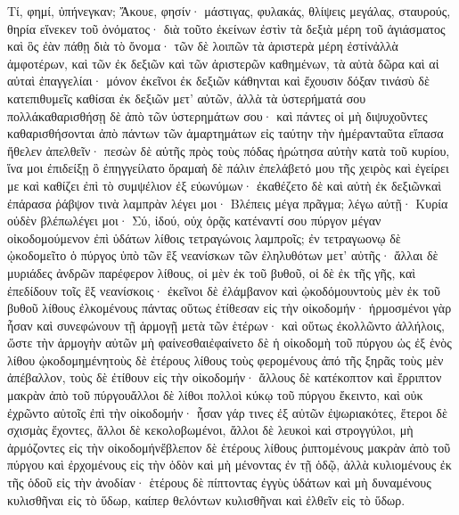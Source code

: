 Τί, φημί, ὐπήνεγκαν; Ἄκουε, φησίν· μάστιγας, φυλακάς, θλίψεις μεγάλας, σταυρούς, θηρία εἵνεκεν τοῦ ὀνόματος· διὰ τοῦτο ἐκείνων ἐστὶν τὰ δεξιὰ μέρη τοῦ ἁγιάσματος καὶ ὃς ἐὰν πάθῃ διὰ τὸ ὄνομα· τῶν δὲ λοιπῶν τὰ ἀριστερὰ μέρη ἐστίνἀλλὰ ἀμφοτέρων, καὶ τῶν ἐκ δεξιῶν καὶ τῶν ἀριστερῶν καθημένων, τὰ αὐτὰ δῶρα καὶ αἱ αὐταὶ ἐπαγγελίαι· μόνον ἐκεῖνοι ἐκ δεξιῶν κάθηνται καὶ ἔχουσιν δόξαν τινάσὺ δὲ κατεπιθυμεῖς καθίσαι ἐκ δεξιῶν μετ’ αὐτῶν, ἀλλὰ τὰ ὑστερήματά σου πολλάκαθαρισθήσῃ δὲ ἀπὸ τῶν ὑστερημάτων σου· καὶ πάντες οἱ μὴ διψυχοῦντες καθαρισθήσονται ἀπὸ πάντων τῶν ἁμαρτημάτων εἰς ταύτην τὴν ἡμέρανταῦτα εἴπασα ἤθελεν ἀπελθεῖν· πεσὼν δὲ αὐτῆς πρὸς τοὺς πόδας ἠρώτησα αὐτὴν κατὰ τοῦ κυρίου, ἵνα μοι ἐπιδείξῃ ὃ ἐπηγγείλατο ὅραμαἡ δὲ πάλιν ἐπελάβετό μου τῆς χειρὸς καὶ ἐγείρει με καὶ καθίζει ἐπὶ τὸ συμψέλιον ἐξ εὐωνύμων· ἐκαθέζετο δὲ καὶ αὐτὴ ἐκ δεξιῶνκαὶ ἐπάρασα ῥάβψον τινὰ λαμπρὰν λέγει μοι· Βλέπεις μέγα πρᾶγμα; λέγω αὐτῇ· Κυρία οὐδὲν βλέπωλέγει μοι· Σύ, ἰδού, οὐχ ὁρᾷς κατέναντί σου πύργον μέγαν οἰκοδομούμενον ἐπὶ ὑδάτων λίθοις τετραγώνοις λαμπροῖς; ἐν τετραγωονῳ δὲ ᾠκοδομεῖτο ὁ πύργος ὑπὸ τῶν ἓξ νεανίσκων τῶν ἐληλυθότων μετ’ αὐτῆς· ἄλλαι δὲ μυριάδες ἀνδρῶν παρέφερον λίθους, οἱ μὲν ἐκ τοῦ βυθοῦ, οἱ δὲ ἐκ τῆς γῆς, καὶ ἐπεδίδουν τοῖς ἓξ νεανίσκοις· ἐκεῖνοι δὲ ἐλάμβανον καὶ ᾠκοδόμουντοὺς μὲν ἐκ τοῦ βυθοῦ λίθους ἐλκομένους πάντας οὕτως ἐτίθεσαν εἰς τὴν οἰκοδομήν· ἡρμοσμένοι γὰρ ἦσαν καὶ συνεφώνουν τῇ ἁρμογῇ μετὰ τῶν ἑτέρων· καὶ οὕτως ἐκολλῶντο ἀλλήλοις, ὥστε τὴν ἁρμογὴν αὐτῶν μὴ φαίνεσθαιἐφαίνετο δὲ ἡ οἰκοδομὴ τοῦ πύργου ὡς ἐξ ἑνὸς λίθου ᾠκοδομημένητοὺς δὲ ἑτέρους λίθους τοὺς φερομένους ἀπό τῆς ξηρᾶς τοὺς μὲν ἀπέβαλλον, τοὺς δὲ ἐτίθουν εἰς τὴν οἰκοδομήν· ἄλλους δὲ κατέκοπτον καὶ ἔρριπτον μακρὰν ἀπὸ τοῦ πύργουἄλλοι δὲ λίθοι πολλοὶ κύκῳ τοῦ πύργου ἔκειντο, καὶ οὐκ ἐχρῶντο αὐτοῖς ἐπὶ τὴν οἰκοδομήν· ἦσαν γάρ τινες ἐξ αὐτῶν ἐψωριακότες, ἕτεροι δὲ σχισμὰς ἔχοντες, ἄλλοι δὲ κεκολοβωμένοι, ἄλλοι δὲ λευκοὶ καὶ στρογγύλοι, μὴ ἁρμόζοντες εἰς τὴν οἰκοδομήνἔβλεπον δὲ ἑτέρους λίθους ῥιπτομένους μακρὰν ἀπὸ τοῦ πύργου καὶ ἐρχομένους εἰς τὴν ὁδὸν καὶ μὴ μένοντας ἐν τῇ ὁδῷ, ἀλλὰ κυλιομένους ἐκ τῆς ὁδοῦ εἰς τὴν ἀνοδίαν· ἑτέρους δὲ πίπτοντας ἐγγὺς ὑδάτων καὶ μὴ δυναμένους κυλισθῆναι εἰς τὸ ὕδωρ, καίπερ θελόντων κυλισθῆναι καὶ ἐλθεῖν εἰς τὸ ὕδωρ.
